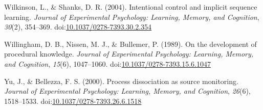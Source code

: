 \documentclass[jou]{apa6}
\theoremstyle{definition}
\theoremstyle{definition}
\theoremstyle{definition}
\theoremstyle{remark}
\begin{document}
\hypertarget{ref-wilkinson_intentional_2004}{}
Wilkinson, L., \& Shanks, D. R. (2004). Intentional control and implicit
sequence learning. \emph{Journal of Experimental Psychology: Learning,
Memory, and Cognition}, \emph{30}(2), 354--369.
doi:\href{https://doi.org/10.1037/0278-7393.30.2.354}{10.1037/0278-7393.30.2.354}

\hypertarget{ref-willingham_development_1989}{}
Willingham, D. B., Nissen, M. J., \& Bullemer, P. (1989). On the
development of procedural knowledge. \emph{Journal of Experimental
Psychology: Learning, Memory, and Cognition}, \emph{15}(6), 1047--1060.
doi:\href{https://doi.org/10.1037/0278-7393.15.6.1047}{10.1037/0278-7393.15.6.1047}

\hypertarget{ref-yu_process_2000}{}
Yu, J., \& Bellezza, F. S. (2000). Process dissociation as source
monitoring. \emph{Journal of Experimental Psychology: Learning, Memory,
and Cognition}, \emph{26}(6), 1518--1533.
doi:\href{https://doi.org/10.1037/0278-7393.26.6.1518}{10.1037/0278-7393.26.6.1518}



\onecolumn
\end{document}
